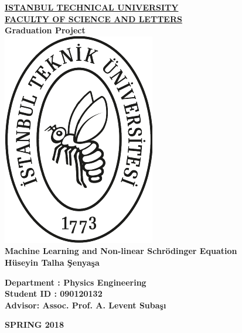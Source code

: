 \documentclass[a4paper,times,hidelinks,12pt]{article}
\begin{document}
\onehalfspacing

\begin{titlepage}
\begin{center}
\vspace*{1cm}
\underline{\textbf{\Large ISTANBUL TECHNICAL UNIVERSITY}} \\[10 pt]

\underline{\textbf{\large FACULTY OF SCIENCE AND LETTERS}} \\[15 pt]

\textbf{\large Graduation Project} \\
\vspace{1.8 cm}
\includegraphics[scale=1.2]{itu_logo.pdf} \\
\vspace{1.8 cm}
\textbf{\large Machine Learning and Non-linear Schr{\"o}dinger Equation} \\[5 pt]
\textbf{H{\"u}seyin Talha \c{S}enya\c{s}a}\\
\vspace{1.5 cm}
\end{center}
\vfill
\textbf{{Department : Physics Engineering}}\\
    \textbf{Student ID \hspace{0.2 cm}: 090120132}\\
    \textbf{Advisor\hspace{1.1 cm}: Assoc. Prof. A. Levent Suba\c{s}{\i}}
\vspace{2 cm}

\center\textbf{SPRING 2018}

\end{titlepage}
\end{document}
